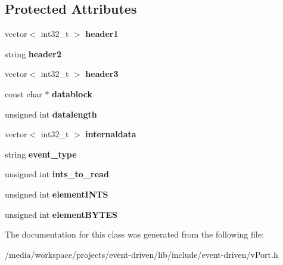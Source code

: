 \subsection*{Protected Attributes}
\begin{DoxyCompactItemize}
\item 
\mbox{\label{classev_1_1vPortableInterface_aa6963fbd9f86d0c12b1cec3f50154039}} 
vector$<$ int32\+\_\+t $>$ {\bfseries header1}
\item 
\mbox{\label{classev_1_1vPortableInterface_aacd6a1f6ca7e75d8b56fb00bdab93115}} 
string {\bfseries header2}
\item 
\mbox{\label{classev_1_1vPortableInterface_a4c8644690c45885728ccded09831b907}} 
vector$<$ int32\+\_\+t $>$ {\bfseries header3}
\item 
\mbox{\label{classev_1_1vPortableInterface_a4e3377c27147a1dd9364a9c01a9433a3}} 
const char $\ast$ {\bfseries datablock}
\item 
\mbox{\label{classev_1_1vPortableInterface_afb56f5c3c78e2029796cc8e3633c7fb1}} 
unsigned int {\bfseries datalength}
\item 
\mbox{\label{classev_1_1vPortableInterface_ae8efe8cb3e40fc651d359073e6f53396}} 
vector$<$ int32\+\_\+t $>$ {\bfseries internaldata}
\item 
\mbox{\label{classev_1_1vPortableInterface_a74417dedd31327a04fcb03f9c5362651}} 
string {\bfseries event\+\_\+type}
\item 
\mbox{\label{classev_1_1vPortableInterface_a9f1790f33d34109839ad9845dffb6e77}} 
unsigned int {\bfseries ints\+\_\+to\+\_\+read}
\item 
\mbox{\label{classev_1_1vPortableInterface_a66759f62e93cdb2e6b82595f486de0ca}} 
unsigned int {\bfseries element\+I\+N\+TS}
\item 
\mbox{\label{classev_1_1vPortableInterface_a1aff2a4a19957a3d28c9981506f65128}} 
unsigned int {\bfseries element\+B\+Y\+T\+ES}
\end{DoxyCompactItemize}


The documentation for this class was generated from the following file\+:\begin{DoxyCompactItemize}
\item 
/media/workspace/projects/event-\/driven/lib/include/event-\/driven/v\+Port.\+h\end{DoxyCompactItemize}

